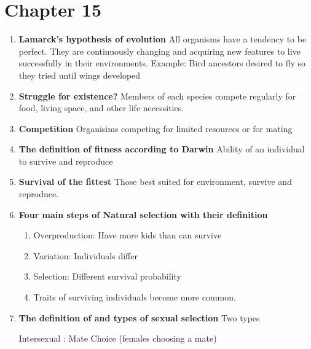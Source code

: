 \documentclass[9pt]{article}
\begin{document}
\section*{Chapter 15}
\begin{enumerate}
  \item {\bf Lamarck's hypothesis of evolution} All organisms have a
    tendency to be perfect. They are continuously changing and
    acquiring new features to live successfully in their
    environments. Example: Bird ancestors desired to fly so they tried
    until wings developed
  \item {\bf Struggle for existence?} Members of each species compete
    regularly for food, living space, and other life necessities.
  \item {\bf Competition} Organisims competing for limited resources or for mating
  \item {\bf The definition of fitness according to Darwin} Ability of an individual to survive and reproduce
  \item {\bf Survival of the fittest} Those best suited for
    environment, survive and reproduce.
  \item {\bf Four main steps of Natural selection with their definition}
    \begin{enumerate}
    \item Overproduction: Have more kids than can survive
    \item Variation: Individuals differ
    \item Selection: Different survival probability
    \item Traits of surviving individuals become more common.
    \end{enumerate}
  \item {\bf The definition of and types of sexual selection} Two types

  Intersexual : Mate Choice (females choosing a mate)


\end{enumerate}
\end{document}
